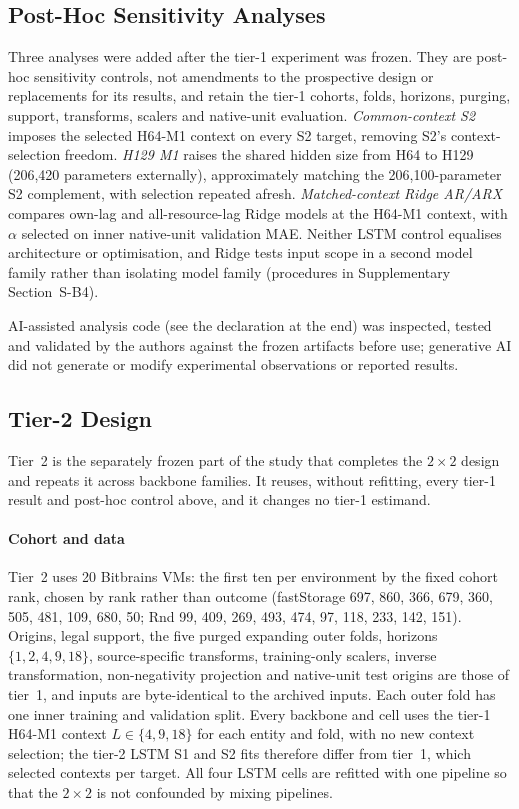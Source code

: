 \documentclass[5p,twocolumn]{elsarticle}
\begin{document}
\subsection{Post-Hoc Sensitivity Analyses}
\label{sec:posthoc-controls}

Three analyses were added after the tier-1 experiment was frozen. They are
post-hoc sensitivity controls, not amendments to the prospective design or
replacements for its results, and retain the tier-1 cohorts, folds, horizons,
purging, support, transforms, scalers and native-unit evaluation.
\emph{Common-context S2} imposes the selected H64-M1 context on every S2 target,
removing S2's context-selection freedom. \emph{H129 M1} raises the shared
hidden size from H64 to H129 (206,420 parameters externally), approximately
matching the 206,100-parameter S2 complement, with selection repeated afresh.
\emph{Matched-context Ridge AR/ARX} compares own-lag and all-resource-lag
Ridge models at the H64-M1 context, with $\alpha$ selected on inner
native-unit validation MAE. Neither LSTM control equalises architecture or
optimisation, and Ridge tests input scope in a second model family rather
than isolating model family (procedures in Supplementary Section~S-B4).

AI-assisted analysis code (see the declaration at the end) was inspected,
tested and validated by the authors against the frozen artifacts before use;
generative AI did not generate or modify experimental observations or reported
results.

\subsection{Tier-2 Design}
\label{sec:tier2-design}

Tier~2 is the separately frozen part of the study that completes the $2\times2$ design
and repeats it across backbone families. It reuses, without refitting, every
tier-1 result and post-hoc control above, and it changes no tier-1 estimand.

\paragraph{Cohort and data} Tier~2 uses 20 Bitbrains VMs: the first ten per
environment by the fixed cohort rank, chosen by rank rather than outcome
(fastStorage 697, 860, 366, 679, 360, 505, 481, 109, 680, 50; Rnd 99, 409,
269, 493, 474, 97, 118, 233, 142, 151). Origins, legal support, the five
purged expanding outer folds, horizons $\{1,2,4,9,18\}$, source-specific
transforms, training-only scalers, inverse transformation, non-negativity
projection and native-unit test origins are those of tier~1, and inputs are
byte-identical to the archived inputs. Each outer fold has one inner
training and validation split. Every backbone and cell uses the tier-1 H64-M1
context $L\in\{4,9,18\}$ for each entity and fold, with no new context
selection; the tier-2 LSTM S1 and S2 fits therefore differ from tier~1, which
selected contexts per target. All four LSTM cells are refitted with one
pipeline so that the $2\times2$ is not confounded by mixing pipelines.
\end{document}
